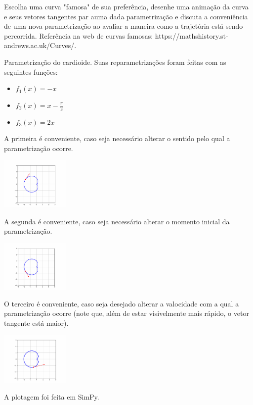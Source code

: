 \documentclass[../main.tex]{subfiles}
\begin{document}
	\begin{exercicio}{7}
		Escolha uma curva "famosa" de sua preferência, desenhe uma animação da curva e seus vetores tangentes par auma dada parametrização e discuta a conveniência de uma nova parametrização ao avaliar a maneira como a trajetória está sendo percorrida. Referência na web de curvas famosas: https://mathshistory.st-andrews.ac.uk/Curves/.
	\end{exercicio}
	\begin{solucao}Parametrização do cardioide. Suas reparametrizações foram feitas com as seguintes funções:
		\begin{itemize}
			\item $f_{1}(x)=-x$
			\item $f_{2}(x)=x-\frac{\pi}{2}$
			\item $f_{3}(x)=2x$
		\end{itemize}	
		A primeira é conveniente, caso seja necessário alterar o sentido pelo qual a parametrização ocorre.
		\begin{center}
			\includegraphics[width=0.25\textwidth]{imagens/lista01/picture_lista01_q07_item01.png}
		\end{center}
		
		A segunda é conveniente, caso seja necessário alterar o momento inicial da parametrização.
		\begin{center}
			\includegraphics[width=0.25\textwidth]{imagens/lista01/picture_lista01_q07_item02.png}
		\end{center}
		
		O terceiro é conveniente, caso seja desejado alterar a valocidade com a qual a parametrização ocorre (note que, além de estar visivelmente mais rápido, o vetor tangente está maior).
		
		\begin{center}
			\includegraphics[width=0.25\textwidth]{imagens/lista01/picture_lista01_q07_item03.png}
		\end{center}
		A plotagem foi feita em SimPy.
	\end{solucao}
	
\end{document}
